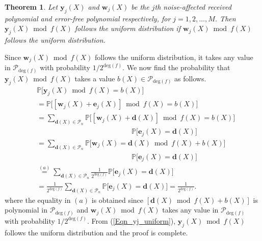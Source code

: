 \documentclass[10pt,journal]{IEEEtran}
\newtheorem{theorem}{Theorem}
\def \deg{{\mathrm{deg}}}
\begin{document}
% 
\begin{theorem}
\label{Theorem_wj_yj_equally_likely}
%  
Let $\mathbf{y}_j(X)$ and $\mathbf{w}_j(X)$ be the $j$th noise-affected received polynomial and error-free polynomial 
respectively, for $j = 1,2,\ldots,M$.
Then $\mathbf{y}_j(X) \bmod f(X)$ follows the uniform distribution if $\mathbf{w}_j(X) \bmod f(X)$ follows the uniform distribution.
% 
\end{theorem}
% 
\begin{IEEEproof}
% 
Since $\mathbf{w}_j(X) \bmod f(X)$ follows the uniform distribution, it takes any value in $\mathcal{P}_{\deg(f)}$
with probability $1/2^{\deg(f)}$. We now find the probability that $\mathbf{y}_j(X) \bmod f(X)$ takes a value $b(X) \in \mathcal{P}_{\deg(f)}$
as follows.
% 
% 
\begin{align}
%  
& \mathbb{P} \Big[\mathbf{y}_j(X) \bmod f(X) = b(X) \Big] \nonumber \\
& = \mathbb{P} \Big[[\mathbf{w}_j(X) + \mathbf{e}_j(X)] \bmod f(X) = b(X) \Big] \nonumber  \\
&= \sum_{\mathbf{d}(X) \in \mathcal{P}_{n}} \mathbb{P} \Big[[\mathbf{w}_j(X) + \mathbf{d}(X)] \bmod f(X) = b(X) \Big] \nonumber  \\
&\mbox{~~~~~~~~~~~~~~~~~~~~~~~~~~~~~~~~~~~~~~~~}\mathbb{P}\Big[\mathbf{e}_j(X) = \mathbf{d}(X)\Big] \nonumber  \\
&= \sum_{\mathbf{d}(X) \in \mathcal{P}_{n}} \mathbb{P} \Big[\mathbf{w}_j(X) = \mathbf{d}(X) \bmod f(X) + b(X) \Big] \nonumber  \\
&\mbox{~~~~~~~~~~~~~~~~~~~~~~~~~~~~~~~~~~~~~~~~}\mathbb{P}\Big[\mathbf{e}_j(X) = \mathbf{d}(X)\Big] \nonumber \\
&\stackrel{(a)}{=} \sum_{\mathbf{d}(X) \in \mathcal{P}_{n}} \frac{1}{2^{\deg(f)}} \mathbb{P} \Big[\mathbf{e}_j(X) = \mathbf{d}(X)\Big] \nonumber \\
&= \frac{1}{2^{\deg(f)}} \sum_{\mathbf{d}(X) \in \mathcal{P}_{n}} \mathbb{P} \Big[\mathbf{e}_j(X) = \mathbf{d}(X)\Big] = \frac{1}{2^{\deg(f)}}.
\label{Eqn_yj_uniform}
% 
\end{align}
% 
% 
where the equality in $(a)$ is obtained since $[\mathbf{d}(X) \bmod f(X) + b(X)]$ is polynomial in $\mathcal{P}_{\deg(f)}$ and 
$\mathbf{w}_j(X) \bmod f(X)$ takes any value in $\mathcal{P}_{\deg(f)}$ with probability $1/2^{\deg(f)}$.
From (\ref{Eqn_yj_uniform}), $\mathbf{y}_j(X) \bmod f(X)$ follows the uniform distribution and the proof is complete.
% 
\end{IEEEproof}
% 
\end{document}
